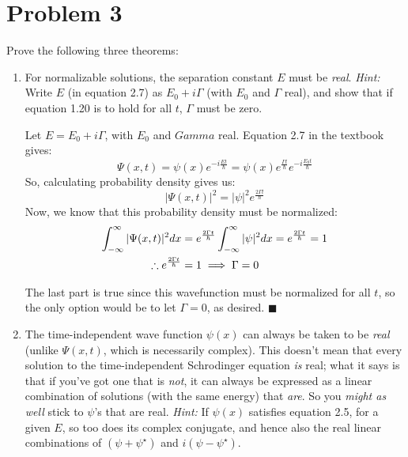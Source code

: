 \documentclass{article}
\begin{document}
\pagebreak
\section*{Problem 3}

Prove the following three theorems: 


\begin{enumerate}[label=(\alph*)]
    \item For normalizable solutions, the separation constant $E$ must be \textit{real}. \textit{Hint:} Write $E$ (in equation 2.7) as $E_0 + i\Gamma$ (with $E_0$ and $\Gamma$ real), and show that if equation 1.20 is to hold for all $t$, $\Gamma$ must be zero.
    
    \begin{solution}
        Let $E = E_0 + i\Gamma$, with $E_0$ and $Gamma$ real. Equation 2.7 in the textbook gives:
        $$\Psi(x,t) = \psi(x)e^{-i\frac{Et}{\hbar}}= \psi(x)e^{\frac{\Gamma t}{\hbar}}e^{-i\frac{E_0t}{\hbar}}$$
        So, calculating probability density gives us:
        $$|\Psi(x,t)|^2 = |\psi|^2e^{\frac{2\Gamma t}{\hbar}}$$
        Now, we know that this probability density must be normalized:
        \begin{align*}
          \int_{-\infty}^{\infty} |\Psi(x,t)|^2 dx &= e^{\frac{2\Gamma t}{\hbar}}\int_{-\infty}^{\infty} |\psi|^2 dx = e^{\frac{2\Gamma t}{\hbar}} = 1\\
          \therefore e^{\frac{2\Gamma t}{\hbar}} &= 1 \implies \Gamma = 0
        \end{align*}

        The last part is true since this wavefunction must be normalized for all $t$, so the only option would be to let $\Gamma = 0$, as desired. $\blacksquare$
    \end{solution}


    \item The time-independent wave function $\psi(x)$ can always be taken to be \textit{real} (unlike $\Psi(x, t)$, which is necessarily complex). This doesn't mean that every solution to the time-independent Schrodinger equation \textit{is} real; what it says is that if you've got one that is \textit{not}, it can always be expressed as a linear combination of solutions (with the same energy) that \textit{are}. So you \textit{might as well} stick to $\psi$'s that are real. \textit{Hint:} If $\psi(x)$ satisfies equation 2.5, for a given $E$, so too does its complex conjugate, and hence also the real linear combinations of $(\psi + \psi^\star)$ and $i(\psi - \psi^\star)$.
    

\end{enumerate}
\end{document}
